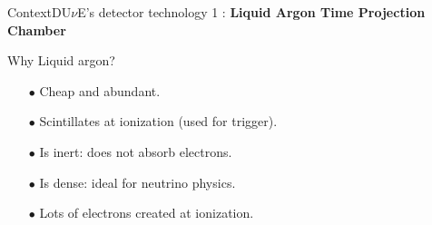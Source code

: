 \documentclass[10pt]{beamer}
\begin{document}
\begin{frame}{Context}{DU$\nu$E's detector technology 1 : \textbf{Liquid Argon Time Projection Chamber}}
\begin{scriptsize}
\begin{minipage}{0.48\textwidth}
    			Why Liquid argon?
    			\begin{itemize}
    				\item[$\bullet$] Cheap and abundant.
    				\item[$\bullet$] Scintillates at ionization (used for trigger).
    				\item[$\bullet$] Is inert: does not absorb electrons.
    				\item[$\bullet$] Is dense: ideal for neutrino physics.
    				\item[$\bullet$] Lots of electrons created at ionization.
    			\end{itemize}
    		\end{minipage}
    	\end{scriptsize}
    \end{frame}
    
\end{document}
